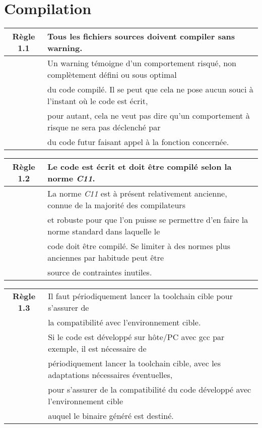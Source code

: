 \section{Compilation}

\begin{center}
\begin{tabular}{|c l|}
\hline
\rowcolor{red!10}\textbf{Règle 1.1} & Tous les fichiers sources doivent compiler sans warning. \\ \hline
 & Un warning témoigne d’un comportement risqué, non complètement défini ou sous optimal \\
 & du code compilé. Il se peut que cela ne pose aucun souci à l’instant où le code est écrit, \\
 & pour autant, cela ne veut pas dire qu’un comportement à risque ne sera pas déclenché par \\
 & du code futur faisant appel à la fonction concernée.\\ \hline
\hline
\end{tabular}
\end{center}

\medskip

\begin{center}
\begin{tabular}{|c l|}
\hline
\rowcolor{red!10}\textbf{Règle 1.2} & Le code est écrit et doit être compilé selon la norme \textit{C11}. \\ \hline
 & La norme \textit{C11} est à présent relativement ancienne, connue de la majorité des compilateurs \\
 & et robuste pour que l’on puisse se permettre d’en faire la norme standard dans laquelle le \\
 & code doit être compilé. Se limiter à des normes plus anciennes par habitude peut être \\
 & source de contraintes inutiles.\\ \hline
\hline
\end{tabular}
\end{center}

\medskip

\begin{center}
\begin{tabular}{|c l|}
\hline
\rowcolor{red!10}\textbf{Règle 1.3} & Il faut périodiquement lancer la toolchain cible pour s’assurer de \\
\rowcolor{red!10} & la compatibilité avec l’environnement cible. \\ \hline
 &  Si le code est développé sur hôte/PC avec gcc par exemple, il est nécessaire de \\
 & périodiquement lancer la toolchain cible, avec les adaptations nécessaires éventuelles, \\
 & pour s’assurer de la compatibilité du code développé avec l’environnement cible \\
 & auquel le binaire généré est destiné. \\ \hline
\hline
\end{tabular}
\end{center}

